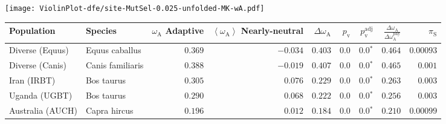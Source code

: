 \begin{center}
\texttt{[image: ViolinPlot-dfe/site-MutSel-0.025-unfolded-MK-wA.pdf]} 
\begin{adjustbox}{width = 1\textwidth}
\begin{tabular}{|l|l|r|r|r|r|r|r|r|}
\toprule
                     Population &              Species & \specialcell{$\omega_{\mathrm{A}}$ \\ Adaptive} & \specialcell{$\left< \omega_{\mathrm{A}} \right>$ \\ Nearly-neutral} & $\Delta \omega_{\mathrm{A}} $ & $p_{\mathrm{v}}$ & $p_{\mathrm{v}}^{\mathrm{adj}}$ & $\frac{\Delta\omega_{\mathrm{A}}}{\Delta\omega_{\mathrm{A}}^{\mathrm{phy}}}$ & $\pi_{\textrm{S}}$ \\
\midrule
                Diverse (Equus) &       Equus caballus &                                        $ 0.369$ &                                           $-0.034$ &                      $ 0.403$ &            $0.0$ &                  $\bm{0.0{^*}}$ &                                           $ 0.464$ &          $0.00093$ \\
                Diverse (Canis) &     Canis familiaris &                                        $ 0.388$ &                                           $-0.019$ &                      $ 0.407$ &            $0.0$ &                  $\bm{0.0{^*}}$ &                                           $ 0.465$ &           $ 0.001$ \\
                    Iran (IRBT) &           Bos taurus &                                        $ 0.305$ &                                           $ 0.076$ &                      $ 0.229$ &            $0.0$ &                  $\bm{0.0{^*}}$ &                                           $ 0.263$ &           $ 0.003$ \\
                  Uganda (UGBT) &           Bos taurus &                                        $ 0.290$ &                                           $ 0.068$ &                      $ 0.222$ &            $0.0$ &                  $\bm{0.0{^*}}$ &                                           $ 0.256$ &           $ 0.003$ \\
               Australia (AUCH) &         Capra hircus &                                        $ 0.196$ &                                           $ 0.012$ &                      $ 0.184$ &            $0.0$ &                  $\bm{0.0{^*}}$ &                                           $ 0.210$ &          $0.00099$ \\

\end{tabular}
\end{adjustbox}
\end{center}
